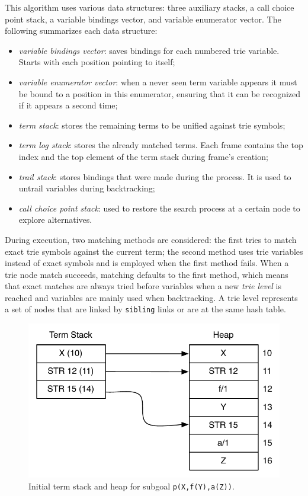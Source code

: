 This algorithm uses various data structures: three auxiliary stacks, a call choice point stack,
a variable bindings vector, and variable enumerator vector. The following summarizes
each data structure: 

\begin{itemize}
  \item \textit{variable bindings vector}: saves bindings for each numbered trie variable. Starts with each position pointing to itself;
  \item \textit{variable enumerator vector}: when a never seen term variable appears it must be bound to a position in this enumerator, ensuring that it can be recognized if it appears a second time;
  \item \textit{term stack}: stores the remaining terms to be unified against trie symbols;
  \item \textit{term log stack}: stores the already matched terms. Each frame contains the top index and the top element of the term stack during frame's creation;
  \item \textit{trail stack}: stores bindings that were made during the process. It is used to untrail variables during backtracking;
  \item \textit{call choice point stack}: used to restore the search process at a certain node to explore alternatives.
\end{itemize}

During execution, two matching methods are considered: the first tries to match exact trie symbols against the current term;
the second method uses trie variables instead of exact symbols and is employed when the first method fails.
When a trie node match succeeds, matching defaults to the first method, which means
that exact matches are always tried before variables when a new \textit{trie level} is reached and variables are mainly
used when backtracking. A trie level represents a set of nodes that are linked by \texttt{sibling} links or are at
the same hash table.

\begin{figure}[ht]
  \centering
    \includegraphics[scale=0.6]{lookup_subgoal_termstack_start.pdf}
  \caption{Initial term stack and heap for subgoal \texttt{p(X,f(Y),a(Z))}.}
  \label{fig:lookup_subgoal_termstack_start}
\end{figure}

